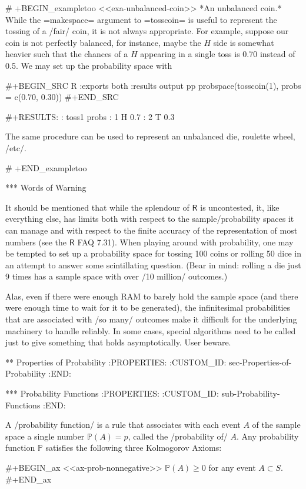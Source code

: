 # +BEGIN_exampletoo
<<exa-unbalanced-coin>> *An unbalanced coin.* While the =makespace=
argument to =tosscoin= is useful to represent the tossing of a /fair/
coin, it is not always appropriate. For example, suppose our coin is
not perfectly balanced, for instance, maybe the \(H\) side is somewhat
heavier such that the chances of a \(H\) appearing in a single toss is
0.70 instead of 0.5. We may set up the probability space with

#+BEGIN_SRC R :exports both :results output pp   
probspace(tosscoin(1), probs = c(0.70, 0.30)) 
#+END_SRC 

#+RESULTS:
:   toss1 probs
: 1     H   0.7
: 2     T   0.3

The same procedure can be used to represent an unbalanced die,
roulette wheel, /etc/.

# +END_exampletoo

*** Words of Warning

It should be mentioned that while the splendour of \(\mathsf{R}\) is
uncontested, it, like everything else, has limits both with respect to
the sample/probability spaces it can manage and with respect to the
finite accuracy of the representation of most numbers (see the
\(\mathsf{R}\) FAQ 7.31). When playing around with probability, one
may be tempted to set up a probability space for tossing 100 coins or
rolling 50 dice in an attempt to answer some scintillating
question. (Bear in mind: rolling a die just 9 times has a sample space
with over /10 million/ outcomes.)

Alas, even if there were enough RAM to barely hold the sample space
(and there were enough time to wait for it to be generated), the
infinitesimal probabilities that are associated with /so many/
outcomes make it difficult for the underlying machinery to handle
reliably. In some cases, special algorithms need to be called just to
give something that holds asymptotically. User beware.

** Properties of Probability
:PROPERTIES:
:CUSTOM_ID: sec-Properties-of-Probability
:END:

*** Probability Functions
:PROPERTIES:
:CUSTOM_ID: sub-Probability-Functions
:END:

A /probability function/ is a rule that associates with each event
\(A\) of the sample space a single number \(\mathbb{P}(A)=p\), called
the /probability of/ \(A\). Any probability function \(\mathbb{P}\)
satisfies the following three Kolmogorov Axioms:

#+BEGIN_ax
<<ax-prob-nonnegative>> \(\mathbb{P}(A)\geq0\) for any event \(A\subset S\).
#+END_ax

